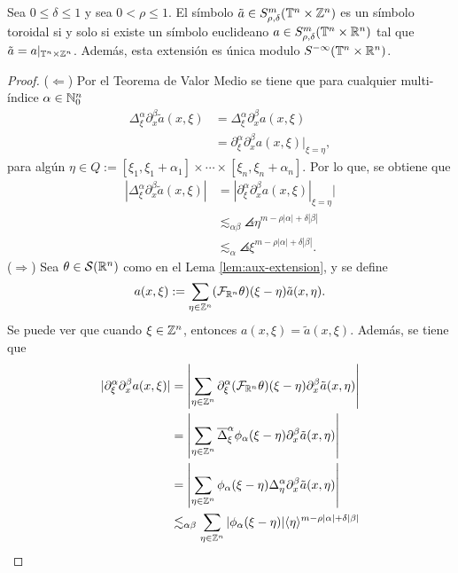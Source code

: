 \begin{theorem}\label{theo:equivalence-symbols}
	Sea $0\leq\delta\leq1$ y sea $0<\rho\leq1$. El símbolo $\tilde{a}\in S^m_{\rho,\delta}(\mathbb{T}^n\times\mathbb{Z}^n)$ es un símbolo toroidal si y solo si existe un símbolo euclideano $a\in S^m_{\rho,\delta}(\mathbb{T}^n\times\mathbb{R}^n)$ tal que $\tilde{a} = a|_{\mathbb{T}^n\times\mathbb{Z}^n}$. Además, esta extensión es única modulo $S^{-\infty}(\mathbb{T}^n\times\mathbb{R}^n)$.
\end{theorem}
\begin{proof}
	($\Leftarrow$) Por el Teorema de Valor Medio se tiene que para cualquier multi-índice $\alpha\in\mathbb{N}_0^n$ 
	\begin{align*}
		\Delta^\alpha_\xi \partial^\beta_x \tilde{a}(x, \xi) &= \Delta^\alpha_\xi \partial^\beta_x {a}(x, \xi) \\
		& = \partial^\alpha_\xi \partial^\beta_x {a}(x, \xi)|_{\xi=\eta},
	\end{align*}
	para algún $\eta\in Q:= [\xi_1, \xi_1 + \alpha_1] \times \cdots\times[\xi_n, \xi_n+\alpha_n]$. Por lo que, se obtiene que 
	\begin{align*}
		|\Delta^\alpha_\xi \partial^\beta_x \tilde{a}(x, \xi)| & = |\partial^\alpha_\xi \partial^\beta_x {a}(x, \xi)|_{\xi=\eta}| \\
		& \lesssim_{\alpha\beta} \angles{\eta}^{m-\rho|\alpha|+\delta|\beta|} \\
		& \lesssim_\alpha \angles{\xi}^{m-\rho|\alpha|+\delta|\beta|}.
	\end{align*}
	($\Rightarrow$)  Sea $\theta\in\mathcal{S}(\mathbb{R}^n)$ como en el Lema \ref{lem:aux-extension}, y se define 
	\begin{equation*}
		a(x, \xi) := \sum_{\eta\in\mathbb{Z}^n} (\mathcal{F}_{\mathbb{R}^n}\theta)(\xi - \eta)\tilde{a}(x, \eta).
	\end{equation*}
	Se puede ver que cuando $\xi\in\mathbb{Z}^n$, entonces $a(x, \xi) = \tilde{a}(x, \xi)$. Además, se tiene que
	\begin{align*}
		|\partial^\alpha_\xi\partial^\beta_x a(x, \xi) | & = \left| \sum_{\eta\in\Z^n} \partial^\alpha_\xi(\mathcal{F}_{\R^n}\theta)(\xi - \eta)\partial^\beta_x\tilde{a}(x, \eta) \right| \\
		& = \left| \sum_{\eta\in\Z^n} \overline{\Delta}^\alpha_\xi\phi_\alpha(\xi-\eta)\partial^\beta_x\tilde{a}(x, \eta) \right|  \\
		& = \left| \sum_{\eta\in\Z^n} \phi_\alpha(\xi-\eta)\Delta^\alpha_\eta\partial^\beta_x\tilde{a}(x, \eta) \right|\\
		& \lesssim_{\alpha\beta} \sum_{\eta\in\Z^n} |\phi_\alpha(\xi-\eta)| \angles{\eta}^{m-\rho|\alpha|+\delta|\beta|} \\

\end{align*}
\end{proof}

